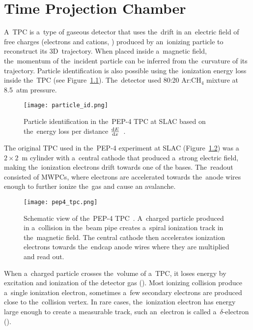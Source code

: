 \chapter{Time Projection Chamber}
\label{sec:tpc}
	
	A~\acf{TPC} is a~type of gaseous detector that uses the~drift in an~electric field of free charges (electrons and cations, ) produced by an~ionizing particle to reconstruct its 3D~trajectory. When placed inside a~magnetic field, the~momentum of the~incident particle can be inferred from the~curvature of its trajectory. Particle identification is also possible using the~ionization energy loss inside the~\ac{TPC} (see Figure~\ref{fig:particleid}). The~detector used 80:20 Ar:CH$_4$ mixture at 8.5~atm pressure.
	
	\begin{figure}[H]
		\centering
		\texttt{[image: particle\_id.png]}
		\caption{Particle identification in the~PEP-4 \ac{TPC} at SLAC based on the~energy loss per distance $\dv{E}{x}$~\cite{particleid}.}
		\label{fig:particleid}
	\end{figure}
	
	The original \ac{TPC} used in the~PEP-4 experiment at SLAC (Figure~\ref{fig:pep4}) was a $2\times2$~m cylinder with a~central cathode that produced a~strong electric field, making the~ionization electrons drift towards one of the bases. The~readout consisted of \ac{MWPC}s, where electrons are accelerated towards the~anode wires enough to further ionize the~gas and cause an avalanche.
	
	\begin{figure}
		\centering
		\texttt{[image: pep4\_tpc.png]}
		\caption{Schematic view of the~PEP-4 \ac{TPC}~\cite{pep4}. A~charged particle produced in a~collision in the~beam pipe creates a~spiral ionization track in the~magnetic field. The central cathode then accelerates ionization electrons towards the~endcap anode wires where they are multiplied and read out.}
		\label{fig:pep4}
	\end{figure}
	
	When a~charged particle crosses the~volume of a~\ac{TPC}, it loses energy by excitation and ionization of the detector gas (). Most ionizing collision produce a~single ionization electron, sometimes a~few secondary electrons are produced close to the~collision vertex. In rare cases, the~ionization electron has energy large enough to create a measurable track, such an~electron is called a~$\delta$\nobreakdash-electron (). 
	
